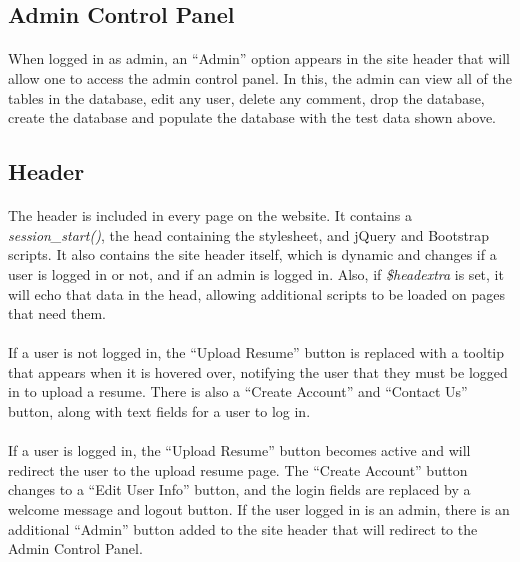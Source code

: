 \documentclass[11pt,letterpaper,titlepage]{article}
\begin{document}
        \subsection{Admin Control Panel}
        \paragraph{}
        When logged in as admin, an ``Admin'' option appears in the site header
        that will allow one to access the admin control panel. In this, the
        admin can view all of the tables in the database, edit any user, delete
        any comment, drop the database, create the database and populate the
        database with the test data shown above.

        \subsection{Header}
        \paragraph{}
        The header is included in every page on the website. It contains a
        \emph{session\_start()}, the head containing the stylesheet, and jQuery
        and Bootstrap scripts. It also contains the site header itself, which is
        dynamic and changes if a user is logged in or not, and if an admin is
        logged in. Also, if \emph{\$headextra} is set, it will echo that data
        in the head, allowing additional scripts to be loaded on pages that need
        them.

        \paragraph{}
        If a user is not logged in, the ``Upload Resume'' button is replaced
        with a tooltip that appears when it is hovered over, notifying the user
        that they must be logged in to upload a resume. There is also a ``Create
        Account'' and ``Contact Us'' button, along with text fields for a
        user to log in.

        \paragraph{}
        If a user is logged in, the ``Upload Resume'' button becomes active and
        will redirect the user to the upload resume page. The ``Create Account''
        button changes to a ``Edit User Info'' button, and the login fields are
        replaced by a welcome message and logout button. If the user logged in
        is an admin, there is an additional ``Admin'' button added to the
        site header that will redirect to the Admin Control Panel.
\end{document}
